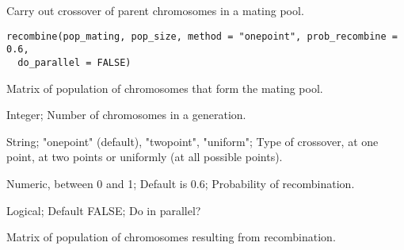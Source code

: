 %
\begin{Description}\relax
Carry out crossover of parent chromosomes in a mating pool.
\end{Description}
%
\begin{Usage}
\begin{verbatim}
recombine(pop_mating, pop_size, method = "onepoint", prob_recombine = 0.6,
  do_parallel = FALSE)
\end{verbatim}
\end{Usage}
%
\begin{Arguments}
\begin{ldescription}
\item[\code{pop\_mating}] Matrix of population of chromosomes that form the mating pool.

\item[\code{pop\_size}] Integer; Number of chromosomes in a generation.

\item[\code{method}] String; "onepoint" (default), "twopoint", "uniform";
Type of crossover, at one point, at two points or uniformly (at all possible points).

\item[\code{prob\_recombine}] Numeric, between 0 and 1; Default is 0.6;
Probability of recombination.

\item[\code{do\_parallel}] Logical; Default FALSE; Do in parallel?
\end{ldescription}
\end{Arguments}
%
\begin{Value}
Matrix of population of chromosomes resulting from recombination.
\end{Value}
